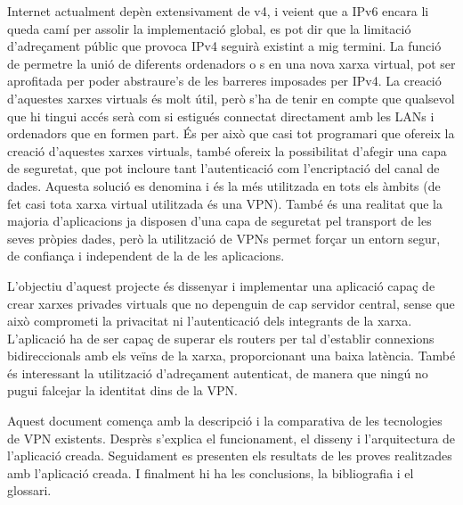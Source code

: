 Internet actualment depèn extensivament de v4, i veient que a IPv6 encara li queda camí per assolir la implementació global, es pot dir que la limitació d'adreçament públic que provoca IPv4 seguirà existint a mig termini. La funció de permetre la unió de diferents ordenadors o s en una nova xarxa virtual, pot ser aprofitada per poder abstraure's de les barreres imposades per IPv4. La creació d'aquestes xarxes virtuals és molt útil, però s'ha de tenir en compte que qualsevol que hi tingui accés serà com si estigués connectat directament amb les LANs i ordenadors que en formen part. És per això que casi tot programari que ofereix la creació d'aquestes xarxes virtuals, també ofereix la possibilitat d'afegir una capa de seguretat, que pot incloure tant l'autenticació com l'encriptació del canal de dades. Aquesta solució es denomina  i és la més utilitzada en tots els àmbits (de fet casi tota xarxa virtual utilitzada és una VPN).
També és una realitat que la majoria d'aplicacions ja disposen d'una capa de seguretat pel transport de les seves pròpies dades, però la utilització de VPNs permet forçar un entorn segur, de confiança i independent de la de les aplicacions. 

L'objectiu d'aquest projecte és dissenyar i implementar una aplicació capaç de crear xarxes privades virtuals que no depenguin de cap servidor central, sense que això comprometi la privacitat ni l'autenticació dels integrants de la xarxa. L'aplicació ha de ser capaç de superar els routers  per tal d'establir connexions bidireccionals amb els veïns de la xarxa, proporcionant una baixa latència. També és interessant la utilització d'adreçament autenticat, de manera que ningú no pugui falcejar la identitat dins de la VPN.

Aquest document comença amb la descripció i la comparativa de les tecnologies de VPN existents.
Desprès s'explica el funcionament, el disseny i l'arquitectura de l'aplicació creada.
Seguidament es presenten els resultats de les proves realitzades amb l'aplicació creada. 
I finalment hi ha les conclusions, la bibliografia i el glossari.
